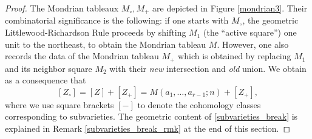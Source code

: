 \documentclass[11pt]{article}
\theoremstyle{definition}
\numberwithin{equation}{section}
\DeclareMathOperator{\Gr}{Gr}
\begin{document}
\begin{proof}
The Mondrian tableaux $M_\circ,M_+$ are depicted in Figure \ref{mondrian3}. Their combinatorial significance is the following: if one starts with $M_\circ$, the geometric Littlewood-Richardson Rule \cite[Algorithm 3.12, step GA2]{Cos09} proceeds by shifting $M_1$ (the ``active square'') one unit to the northeast, to obtain the Mondrian tableau $M$. However, one also records the data of the Mondrian tableau $M_+$ which is obtained by replacing $M_1$ and its neighbor square $M_2$ with their \emph{new} intersection and \emph{old} union. We obtain as a consequence \cite[Theorem 3.32]{Cos09} that
\begin{equation}\label{subvarieties_break}
[Z_\circ]=[Z]+[Z_+]=M(a_1,\ldots,a_{r-1};n)+[Z_+],
\end{equation}
where we use square brackets $[-]$ to denote the cohomology classes corresponding to subvarieties. The geometric content of \eqref{subvarieties_break} is explained in Remark \ref{subvarieties_break_rmk} at the end of this section.

%


\end{proof}
\end{document}
